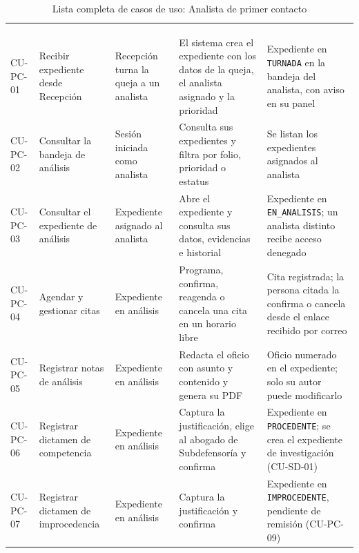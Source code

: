 \footnotesize
\renewcommand{\arraystretch}{1.2}
\setlength{\tabcolsep}{4pt}
\begin{longtable}{|L{1.6cm}|L{3.0cm}|L{2.9cm}|L{4.2cm}|L{3.5cm}|}
	\hiderowcolors\caption{Lista completa de casos de uso: Analista de primer contacto}
	\label{tab:anx_cu_pc} \\ \showrowcolors
	\hline
	 &  &  &  &  \\
	\hline
	\endfirsthead
	\hline
	 &  &  &  &  \\
	\hline
	\endhead
	CU-PC-01 & Recibir expediente desde Recepción & Recepción turna la queja a un analista & El sistema crea el expediente con los datos de la queja, el analista asignado y la prioridad & Expediente en \texttt{TURNADA} en la bandeja del analista, con aviso en su panel \\ \hline
	CU-PC-02 & Consultar la bandeja de análisis & Sesión iniciada como analista & Consulta sus expedientes y filtra por folio, prioridad o estatus & Se listan los expedientes asignados al analista \\ \hline
	CU-PC-03 & Consultar el expediente de análisis & Expediente asignado al analista & Abre el expediente y consulta sus datos, evidencias e historial & Expediente en \texttt{EN\_ANALISIS}; un analista distinto recibe acceso denegado \\ \hline
	CU-PC-04 & Agendar y gestionar citas & Expediente en análisis & Programa, confirma, reagenda o cancela una cita en un horario libre & Cita registrada; la persona citada la confirma o cancela desde el enlace recibido por correo \\ \hline
	CU-PC-05 & Registrar notas de análisis & Expediente en análisis & Redacta el oficio con asunto y contenido y genera su PDF & Oficio numerado en el expediente; solo su autor puede modificarlo \\ \hline
	CU-PC-06 & Registrar dictamen de competencia & Expediente en análisis & Captura la justificación, elige al abogado de Subdefensoría y confirma & Expediente en \texttt{PROCEDENTE}; se crea el expediente de investigación (CU-SD-01) \\ \hline
	CU-PC-07 & Registrar dictamen de improcedencia & Expediente en análisis & Captura la justificación y confirma & Expediente en \texttt{IMPROCEDENTE}, pendiente de remisión (CU-PC-09) \\ \hline

\end{longtable}
